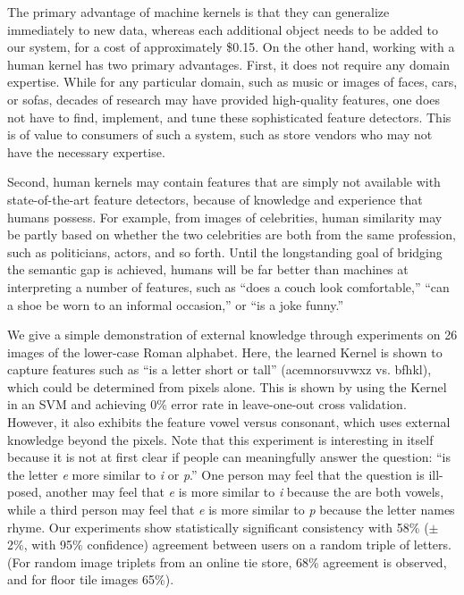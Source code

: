 \documentclass{article}
\begin{document}
The primary advantage of machine kernels is that they can generalize immediately to new data, whereas each additional object needs to be added to our system, for a cost of approximately \$0.15.  On the other hand, working with a human kernel has two primary advantages.  First, it does not require any domain expertise.  While for any particular domain, such as music or images of faces, cars, or sofas, decades of research may have provided high-quality features, one does not have to find, implement, and tune these sophisticated feature detectors.  This is of value to consumers of such a system, such as store vendors who may not have the necessary expertise.

Second, human kernels may contain features that are simply not available with state-of-the-art feature detectors, because of knowledge and experience that humans possess.  For example, from images of celebrities, human similarity may be partly based on whether the two celebrities are both from the same profession, such as politicians, actors, and so forth.  Until the longstanding goal of bridging the semantic gap is achieved, humans will be far better than machines at interpreting a number of features, such as ``does a couch look comfortable,'' ``can a shoe be worn to an informal occasion,'' or ``is a joke funny.''

We give a simple demonstration of external knowledge through experiments on 26 images of the lower-case Roman alphabet.  Here, the learned Kernel is shown to capture features such as ``is a letter short or tall'' (acemnorsuvwxz vs. bfhkl), which could be determined from pixels alone. This is shown by using the Kernel in an SVM and achieving 0\% error rate in leave-one-out cross validation.  However, it also exhibits the feature vowel versus consonant, which uses external knowledge beyond the pixels.  Note that this experiment is interesting in itself because it is not at first clear if people can meaningfully answer the question: ``is the letter {\em e} more similar to {\em i} or {\em p}.'' One person may feel that the question is ill-posed, another may feel that {\em e} is more similar to {\em i} because the are both vowels, while a third person may feel that {\em e} is more similar to {\em p} because the letter names rhyme.
Our experiments show statistically significant consistency with 58\% ($\pm$2\%, with 95\% confidence) agreement between users on a random triple of letters.  (For random image triplets from an online tie store, 68\% agreement is observed, and for floor tile images 65\%).
\end{document}

